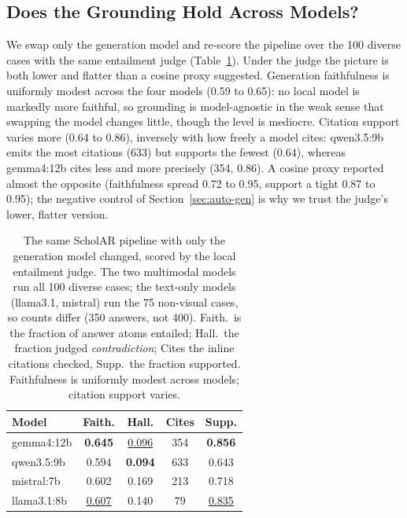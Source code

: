 \documentclass[11pt,letterpaper]{article}
\newcommand{\best}[1]{\textbf{#1}}
\newcommand{\snd}[1]{\underline{#1}}
\begin{document}
\subsection{Does the Grounding Hold Across Models?}
\label{sec:auto-models}
We swap only the generation model and re-score the pipeline over the 100 diverse cases with the
same entailment judge (Table~\ref{tab:models}). Under the judge the picture is both lower and
flatter than a cosine proxy suggested. Generation faithfulness is uniformly modest across the
four models (0.59 to 0.65): no local model is markedly more faithful, so grounding is
model-agnostic in the weak sense that swapping the model changes little, though the level is
mediocre. Citation support varies more (0.64 to 0.86), inversely with how freely a model cites:
qwen3.5:9b emits the most citations (633) but supports the fewest (0.64), whereas gemma4:12b cites
less and more precisely (354, 0.86). A cosine proxy reported almost the opposite (faithfulness
spread 0.72 to 0.95, support a tight 0.87 to 0.95); the negative control of
Section~\ref{sec:auto-gen} is why we trust the judge's lower, flatter version.

\begin{table}[t]
  \centering
  \caption{The same ScholAR pipeline with only the generation model changed, scored by the local
           entailment judge. The two multimodal models run all 100 diverse cases; the text-only
           models (llama3.1, mistral) run the 75 non-visual cases, so counts differ (350 answers,
           not 400). Faith.\ is the fraction of answer atoms entailed; Hall.\ the fraction judged
           \emph{contradiction}; Cites the inline citations checked, Supp.\ the fraction supported.
           Faithfulness is uniformly modest across models; citation support varies.}
  \label{tab:models}
  \setlength{\tabcolsep}{5pt}
  \begin{tabular}{lcccc}
    \toprule
    \textbf{Model} & \textbf{Faith.} & \textbf{Hall.} & \textbf{Cites} & \textbf{Supp.} \\
    \midrule
    gemma4:12b   & \best{0.645} & \snd{0.096} & 354 & \best{0.856} \\
    qwen3.5:9b   & 0.594 & \best{0.094} & 633 & 0.643 \\
    mistral:7b   & 0.602 & 0.169 & 213 & 0.718 \\
    llama3.1:8b  & \snd{0.607} & 0.140 &  79 & \snd{0.835} \\
    \bottomrule
  \end{tabular}
\end{table}
\end{document}
